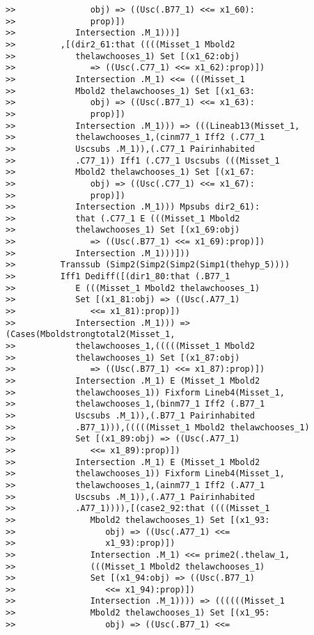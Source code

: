 \documentclass[12pt]{article}
\begin{document}
\begin{verbatim}
>>               obj) => ((Usc(.B77_1) <<= x1_60):
>>               prop)])
>>            Intersection .M_1)))]
>>         ,[(dir2_61:that ((((Misset_1 Mbold2
>>            thelawchooses_1) Set [(x1_62:obj)
>>               => ((Usc(.C77_1) <<= x1_62):prop)])
>>            Intersection .M_1) <<= (((Misset_1
>>            Mbold2 thelawchooses_1) Set [(x1_63:
>>               obj) => ((Usc(.B77_1) <<= x1_63):
>>               prop)])
>>            Intersection .M_1))) => (((Lineab13(Misset_1,
>>            thelawchooses_1,(cinm77_1 Iff2 (.C77_1
>>            Uscsubs .M_1)),(.C77_1 Pairinhabited
>>            .C77_1)) Iff1 (.C77_1 Uscsubs (((Misset_1
>>            Mbold2 thelawchooses_1) Set [(x1_67:
>>               obj) => ((Usc(.C77_1) <<= x1_67):
>>               prop)])
>>            Intersection .M_1))) Mpsubs dir2_61):
>>            that (.C77_1 E (((Misset_1 Mbold2
>>            thelawchooses_1) Set [(x1_69:obj)
>>               => ((Usc(.B77_1) <<= x1_69):prop)])
>>            Intersection .M_1)))]))
>>         Transsub (Simp2(Simp2(Simp2(Simp1(thehyp_5))))
>>         Iff1 Dediff([(dir1_80:that (.B77_1
>>            E (((Misset_1 Mbold2 thelawchooses_1)
>>            Set [(x1_81:obj) => ((Usc(.A77_1)
>>               <<= x1_81):prop)])
>>            Intersection .M_1))) => (Cases(Mboldstrongtotal2(Misset_1,
>>            thelawchooses_1,(((((Misset_1 Mbold2
>>            thelawchooses_1) Set [(x1_87:obj)
>>               => ((Usc(.B77_1) <<= x1_87):prop)])
>>            Intersection .M_1) E (Misset_1 Mbold2
>>            thelawchooses_1)) Fixform Lineb4(Misset_1,
>>            thelawchooses_1,(binm77_1 Iff2 (.B77_1
>>            Uscsubs .M_1)),(.B77_1 Pairinhabited
>>            .B77_1))),(((((Misset_1 Mbold2 thelawchooses_1)
>>            Set [(x1_89:obj) => ((Usc(.A77_1)
>>               <<= x1_89):prop)])
>>            Intersection .M_1) E (Misset_1 Mbold2
>>            thelawchooses_1)) Fixform Lineb4(Misset_1,
>>            thelawchooses_1,(ainm77_1 Iff2 (.A77_1
>>            Uscsubs .M_1)),(.A77_1 Pairinhabited
>>            .A77_1)))),[(case2_92:that ((((Misset_1
>>               Mbold2 thelawchooses_1) Set [(x1_93:
>>                  obj) => ((Usc(.A77_1) <<=
>>                  x1_93):prop)])
>>               Intersection .M_1) <<= prime2(.thelaw_1,
>>               (((Misset_1 Mbold2 thelawchooses_1)
>>               Set [(x1_94:obj) => ((Usc(.B77_1)
>>                  <<= x1_94):prop)])
>>               Intersection .M_1)))) => ((((((Misset_1
>>               Mbold2 thelawchooses_1) Set [(x1_95:
>>                  obj) => ((Usc(.B77_1) <<=

\end{verbatim}
\end{document}
